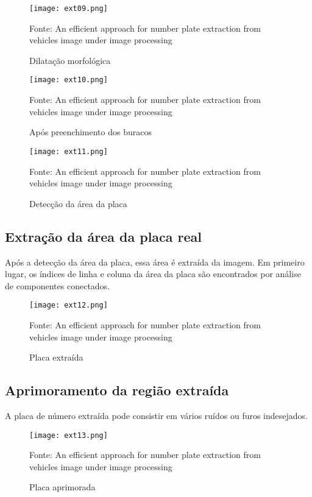 \begin{figure}[H]
	\centering
	\texttt{[image: ext09.png]}
	\caption{Dilatação morfológica}
Fonte: An efficient approach for number plate extraction from vehicles image under image processing~\cite{kaur2014efficient}
	\label{fig:ext_morphological_dilation}
\end{figure}

\begin{figure}[H]
	\centering
	\texttt{[image: ext10.png]}
	\caption{Após preenchimento dos buracos}
Fonte: An efficient approach for number plate extraction from vehicles image under image processing~\cite{kaur2014efficient}
	\label{fig:ext_holes_filled}
\end{figure}

\begin{figure}[H]
	\centering
	\texttt{[image: ext11.png]}
	\caption{Detecção da área da placa}
Fonte: An efficient approach for number plate extraction from vehicles image under image processing~\cite{kaur2014efficient}
	\label{fig:ext_plate_area_detection}
\end{figure}

\subsection{Extração da área da placa real}

Após a detecção da área da placa, essa área é extraída da imagem. Em primeiro
lugar, os índices de linha e coluna da área da placa são encontrados por análise
de componentes conectados.

\begin{figure}[H]
	\centering
	\texttt{[image: ext12.png]}
	\caption{Placa extraída}
Fonte: An efficient approach for number plate extraction from vehicles image under image processing~\cite{kaur2014efficient}
	\label{fig:ext_true_number_plate}
\end{figure}

\subsection{Aprimoramento da região extraída}

A placa de número extraída pode consistir em vários ruídos ou furos indesejados.

\begin{figure}[H]
	\centering
	\texttt{[image: ext13.png]}
	\caption{Placa aprimorada}
Fonte: An efficient approach for number plate extraction from vehicles image under image processing~\cite{kaur2014efficient}
	\label{fig:ext_enhanced_number_plate}
\end{figure}


